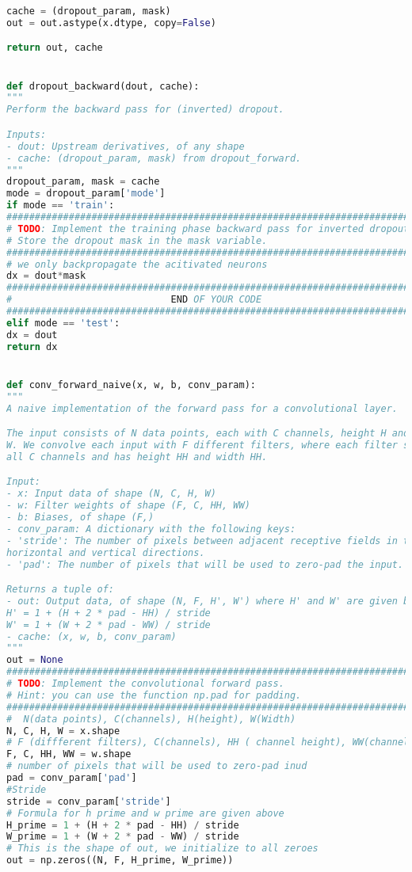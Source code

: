 \begin{lstlisting}[language=Python, label=lst:layers.py, caption={layers.py}, basicstyle=\tiny]
cache = (dropout_param, mask)
out = out.astype(x.dtype, copy=False)

return out, cache


def dropout_backward(dout, cache):
"""
Perform the backward pass for (inverted) dropout.

Inputs:
- dout: Upstream derivatives, of any shape
- cache: (dropout_param, mask) from dropout_forward.
"""
dropout_param, mask = cache
mode = dropout_param['mode']
if mode == 'train':
###########################################################################
# TODO: Implement the training phase backward pass for inverted dropout.   #
# Store the dropout mask in the mask variable.                            #
###########################################################################
# we only backpropagate the acitivated neurons
dx = dout*mask
###########################################################################
#                            END OF YOUR CODE                             #
###########################################################################
elif mode == 'test':
dx = dout
return dx


def conv_forward_naive(x, w, b, conv_param):
"""
A naive implementation of the forward pass for a convolutional layer.

The input consists of N data points, each with C channels, height H and width
W. We convolve each input with F different filters, where each filter spans
all C channels and has height HH and width HH.

Input:
- x: Input data of shape (N, C, H, W)
- w: Filter weights of shape (F, C, HH, WW)
- b: Biases, of shape (F,)
- conv_param: A dictionary with the following keys:
- 'stride': The number of pixels between adjacent receptive fields in the
horizontal and vertical directions.
- 'pad': The number of pixels that will be used to zero-pad the input.

Returns a tuple of:
- out: Output data, of shape (N, F, H', W') where H' and W' are given by
H' = 1 + (H + 2 * pad - HH) / stride
W' = 1 + (W + 2 * pad - WW) / stride
- cache: (x, w, b, conv_param)
"""
out = None
#############################################################################
# TODO: Implement the convolutional forward pass.                           #
# Hint: you can use the function np.pad for padding.                        #
#############################################################################
#  N(data points), C(channels), H(height), W(Width)
N, C, H, W = x.shape
# F (diffferent filters), C(channels), HH ( channel height), WW(channel width)
F, C, HH, WW = w.shape
# number of pixels that will be used to zero-pad inud
pad = conv_param['pad']
#Stride
stride = conv_param['stride']
# Formula for h prime and w prime are given above
H_prime = 1 + (H + 2 * pad - HH) / stride
W_prime = 1 + (W + 2 * pad - WW) / stride
# This is the shape of out, we initialize to all zeroes
out = np.zeros((N, F, H_prime, W_prime))


\end{lstlisting}
